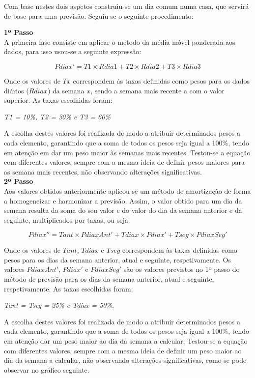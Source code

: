 Com base nestes dois aspetos construiu-se um dia comum numa casa, que servirá de base para uma previsão. Seguiu-se o seguinte procedimento:


\textbf{1º Passo}\\
A primeira fase consiste em aplicar o método da média móvel ponderada aos dados, para isso usou-se a seguinte expressão:

\begin{equation} 
Pdiax'= T1 \times Rdia1 + T2 \times Rdia2 + T3 \times Rdia3
\end{equation}

Onde os valores de $Tx$ correspondem às taxas definidas como pesos para os dados diários ($Rdiax$) da semana $x$, sendo a semana mais recente a com o valor superior. As taxas escolhidas foram: 
\begin{center}
	\textit{T1 = 10\%, T2 = 30\% e T3 = 60\%}
\end{center}
A escolha destes valores foi realizada de modo a atribuir determinados pesos a cada elemento, garantindo que a soma de todos os pesos seja igual a 100\%, tendo em atenção em dar um peso maior às semanas mais recentes. Testou-se a equação com diferentes valores, sempre com a mesma ideia de definir pesos maiores para as semana mais recentes, não observando alterações significativas.\\

\textbf{2º Passo}\\
Aos valores obtidos anteriormente aplicou-se um método de amortização de forma a homogeneizar e harmonizar a previsão. Assim, o valor obtido para um dia da semana resulta da soma do seu valor e do valor do dia da semana anterior e da seguinte, multiplicados por taxas, ou seja: 

\begin{equation} 
Pdiax''= Tant \times PdiaxAnt' + Tdiax \times Pdiax' + Tseg \times PdiaxSeg'
\end{equation}

Onde os valores de $Tant$, $Tdiax$ e $Tseg$ correspondem às taxas definidas como pesos para os dias da semana anterior, atual e seguinte, respetivamente. Os valores $PdiaxAnt'$, $Pdiax'$ e $PdiaxSeg'$ são os valores previstos no 1º passo do método de previsão para os dias da semana anterior, atual e seguinte, respetivamente. As taxas escolhidas foram: 

\begin{center}
	\textit{Tant = Tseg = 25\%  e Tdiax = 50\%.}
\end{center}
A escolha destes valores foi realizada de modo a atribuir determinados pesos a cada elemento, garantindo que a soma de todos os pesos seja igual a 100\%, tendo em atenção dar um peso maior ao dia da semana a calcular. Testou-se a equação com diferentes valores, sempre com a mesma ideia de definir um peso maior ao dia da semana a calcular, não observando alterações significativas, como se pode observar no gráfico seguinte.

